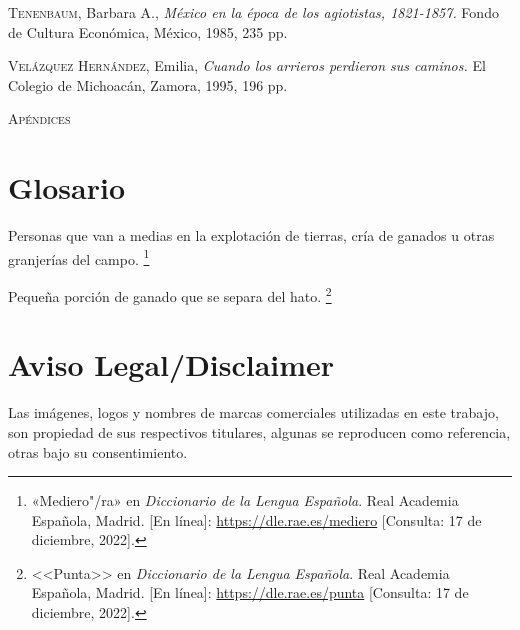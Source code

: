 \documentclass[14pt,twoside,final]{extbook} %
\let\oldfootnote\footnote
\renewcommand\footnote[1]{%
\oldfootnote{\hspace{1mm}#1}}
\begin{document}
\textsc{Tenenbaum}, Barbara A., \emph{México en la época de los agiotistas, 1821-1857.} Fondo de Cultura Económica, México, 1985, 235 pp.

\textsc{Velázquez Hernández}, Emilia, \emph{Cuando los arrieros perdieron sus caminos.} El Colegio de Michoacán, Zamora, 1995, 196 pp.
\cleardoublepage
\newpage
\pagestyle{empty}
\hspace*{0pt}
\vfill
\begin{center}
\Huge\scshape Apéndices
\end{center}
\vfill
\appendix
\chapter{Glosario}
\label{ap:glosario}
\thispagestyle{empty}
\pagestyle{fancy}
\fancyhf{} %
\fancyhead[RO,LE]{\thepage}
\renewcommand{\headrulewidth}{0pt}
\begin{description}[noitemsep]
\item[Medieros]Personas que van a medias en la explotación de tierras, cría de ganados u otras granjerías del campo.\footnote{«Mediero"/ra» en \emph{Diccionario de la Lengua Española}. Real Academia Española, Madrid. [En línea]: \url{https://dle.rae.es/mediero} [Consulta: 17 de diciembre, 2022].}
\item[Punta de ganado]Pequeña porción de ganado que se separa del hato.\footnote{<<Punta>> en \emph{Diccionario de la Lengua Española}. Real Academia Española, Madrid. [En línea]: \url{https://dle.rae.es/punta} [Consulta: 17 de diciembre, 2022].}
\end{description}
\chapter{Aviso Legal/Disclaimer}
\label{ap:aviso-legal-disclaimer}
\thispagestyle{empty}
\pagestyle{fancy}
\fancyhf{} %
\fancyhead[RO,LE]{\thepage}
\renewcommand{\headrulewidth}{0pt}
\renewcommand{\TeX}{T\kern -.1267em\lower .35ex\hbox {E}\kern -.105emX} %
\renewcommand{\LaTeX}{L\kern-.275em\raisebox{.5ex}{\textsc{a}}\kern-.1em\hbox{\TeX}} %
\renewcommand{\LaTeXe}{L\kern-.275em\raisebox{.5ex}{\textsc{a}}\kern-.1em\hbox{\TeX} \hbox{2}\kern-.03em\raisebox{-.4ex}{\fontencoding{LGR}\selectfont\char 101}} %
Las imágenes, logos y nombres de marcas comerciales utilizadas en este trabajo, son propiedad de sus respectivos titulares, algunas se reproducen como referencia, otras bajo su consentimiento. \\
\end{document}
